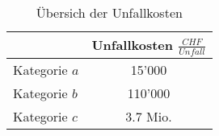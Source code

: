 %
%
%
%

\begin{table}[h!]
\flushleft
\renewcommand{\arraystretch}{1.4}

\begin{tabular}{ @{} l|c @{} }
            			& Unfallkosten   $\frac{CHF}{Unfall}$	       \\ \hline
Kategorie $a$	    	&       15'000          		                \\
Kategorie $b$           &      	110'000						      \\
Kategorie $c$		    &        3.7 Mio.  		                       
\end{tabular}
\caption{Übersich der Unfallkosten}
\label{tab:t-04-03-04-Unfallkosten}
\end{table}

%
%





%


